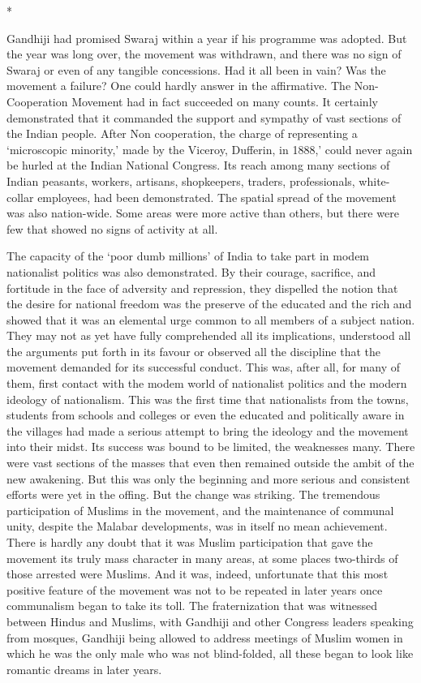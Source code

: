\begin{center}*\end{center}



Gandhiji had promised Swaraj within a year if his programme was adopted. But the year was long over, the movement was withdrawn, and there was no sign of Swaraj or even of any tangible concessions. Had it all been in vain? Was the movement a failure? One could hardly answer in the affirmative. The Non- Cooperation Movement had in fact succeeded on many counts. It certainly demonstrated that it commanded the support and sympathy of vast sections of the Indian people. After Non­ cooperation, the charge of representing a ‘microscopic minority,’ made by the Viceroy, Dufferin, in 1888,’ could never again be hurled at the Indian National Congress. Its reach among many sections of Indian peasants, workers, artisans, shopkeepers, traders, professionals, white-collar employees, had been demonstrated. The spatial spread of the movement was also nation-wide. Some areas were more active than others, but there were few that showed no signs of activity at all. 

The capacity of the ‘poor dumb millions’ of India to take part in modem nationalist politics was also demonstrated. By their courage, sacrifice, and fortitude in the face of adversity and repression, they dispelled the notion that the desire for national freedom was the preserve of the educated and the rich and showed that it was an elemental urge common to all members of a subject nation. They may not as yet have fully comprehended all its implications, understood all the arguments put forth in its favour or observed all the discipline that the movement demanded for its successful conduct. This was, after all, for many of them, first contact with the modem world of nationalist politics and the modern ideology of nationalism. This was the first time that nationalists from the towns, students from schools and colleges or even the educated and politically aware in the villages had made a serious attempt to bring the ideology and the movement into their midst. Its success was bound to be limited, the weaknesses many. There were vast sections of the masses that even then remained outside the ambit of the new awakening. But this was only the beginning and more serious and consistent efforts were yet in the offing. But the change was striking. The tremendous participation of Muslims in the movement, and the maintenance of communal unity, despite the Malabar developments, was in itself no mean achievement. There is hardly any doubt that it was Muslim participation that gave the movement its truly mass character in many areas, at some places two-thirds of those arrested were Muslims. And it was, indeed, unfortunate that this most positive feature of the movement was not to be repeated in later years once communalism began to take its toll. The fraternization that was witnessed between Hindus and Muslims, with Gandhiji and other Congress leaders speaking from mosques, Gandhiji being allowed to address meetings of Muslim women in which he was the only male who was not blind-folded, all these began to look like romantic dreams in later years.

